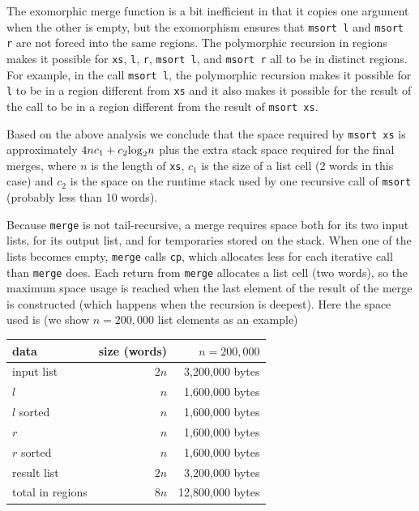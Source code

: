 \documentclass[12pt]{book}
\begin{document}
The exomorphic merge function is a bit inefficient in that it copies one
argument when the other is empty, but the exomorphism ensures that
\lstinline{msort l} and \lstinline{msort r} are not forced into the same
regions. The polymorphic recursion in regions makes it possible for
\lstinline{xs}, \lstinline{l}, \lstinline{r}, \lstinline{msort l}, and
\lstinline{msort r} all to be in distinct regions. For example, in the call
\lstinline{msort l}, the polymorphic recursion makes it possible for
\lstinline{l} to be in a region different from \lstinline{xs} and it also makes
it possible for the result of the call to be in a region different from the
result of \lstinline{msort xs}.

Based on the above analysis we conclude that the space required by
\lstinline{msort xs} is approximately $4nc_1+c_2{\rm log}_2n$ plus the extra
stack space required for the final merges, where $n$ is the length of
\lstinline{xs}, $c_1$ is the size of a list cell (2 words in this case) and
$c_2$ is the space on the runtime stack used by one recursive call of
\lstinline{msort} (probably less than 10 words).

Because \lstinline{merge} is not tail-recursive, a merge requires space both for
its two input lists, for its output list, and for temporaries stored on the
stack.  When one of the lists becomes empty, \lstinline{merge} calls
\lstinline{cp}, which allocates less for each iterative call than
\lstinline{merge} does. Each return from \lstinline{merge} allocates a list cell
(two words), so the maximum space usage is reached when the last element of the
result of the merge is constructed (which happens when the recursion is
deepest). Here the space used is (we show $n = 200,000$ list elements as an
example)
\begin{center}
\begin{tabular}{lrr}
{\bf data} & {\bf size (words)} &$n=200,000$\\ \hline
input list& $2n$ & 3,200,000 bytes\\
$l$ & $n$ & 1,600,000 bytes\\
$l$ sorted & $n$ & 1,600,000 bytes\\
$r$ & $n$ & 1,600,000 bytes\\
$r$ sorted & $n$ & 1,600,000 bytes\\
result list & $2n$ & 3,200,000 bytes\\ \hline
total in regions& $8n$ & 12,800,000 bytes
\end{tabular}
\end{center}
\end{document}
